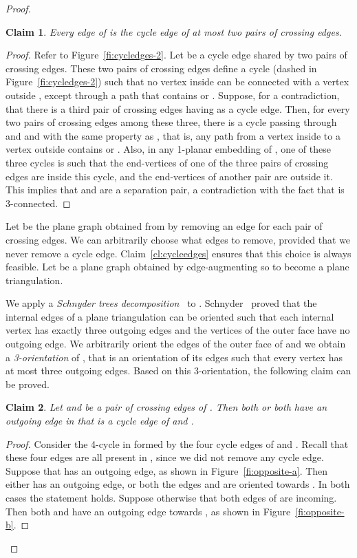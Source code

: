\documentclass{article}
\newtheorem{claim}{Claim}
\begin{document}
\begin{proof}
\begin{claim}\label{cl:cycleedges-2}
Every edge of  is the cycle edge of at most two pairs of crossing edges.
\end{claim}
\begin{proof}
Refer to Figure~\ref{fi:cycledges-2}. Let  be a cycle edge shared by two pairs of crossing edges. These two pairs of crossing edges define a cycle  (dashed in Figure~\ref{fi:cycledges-2}) such that no vertex inside  can be connected with a vertex outside , except through a path that contains  or . Suppose, for a contradiction, that there is a third pair of crossing edges having  as a cycle edge. Then, for every two pairs of crossing edges among these three, there is a cycle   passing through  and  and with the same property as , that is, any path from a vertex inside  to a vertex outside  contains  or . Also, in any 1-planar embedding of , one of these three cycles is such that the end-vertices of one of the three pairs of crossing edges are inside this cycle, and the end-vertices of another pair are outside it.  This implies that  and  are a separation pair, a contradiction with the fact that  is 3-connected.
\end{proof}

Let  be the plane graph obtained from  by removing an edge for each pair of crossing edges. We can arbitrarily choose what edges to remove, provided that we never remove a cycle edge. Claim~\ref{cl:cycleedges} ensures that this choice is always feasible.  Let  be a plane graph obtained by edge-augmenting  so to become a plane triangulation.

We apply a {\em Schnyder trees decomposition}~\cite{DBLP:conf/soda/Schnyder90} to . Schnyder~\cite{DBLP:conf/soda/Schnyder90} proved that the internal edges of a plane triangulation can be oriented such that each internal vertex has exactly three outgoing edges and the vertices of the outer face have no outgoing edge. We arbitrarily orient the edges of the outer face of  and we obtain a {\em 3-orientation} of , that is an orientation of its edges such that every vertex has at most three outgoing edges. Based on this 3-orientation, the following claim can be proved.


\begin{claim}\label{cl:opposite}
Let  and  be a pair of crossing edges of . Then both  or both  have an outgoing edge in  that is a cycle edge of  and .
\end{claim}
\begin{proof}
Consider the 4-cycle in  formed by the four cycle edges of  and . Recall that these four edges are all present in , since we did not remove any cycle edge. Suppose that  has an outgoing edge, as shown in Figure~\ref{fi:opposite-a}. Then either  has an outgoing edge, or both the edges  and  are oriented towards . In both cases the statement holds. Suppose otherwise that both edges of  are incoming. Then both  and  have an outgoing edge towards , as shown in Figure~\ref{fi:opposite-b}.
\end{proof}


\end{proof}
\end{document}
